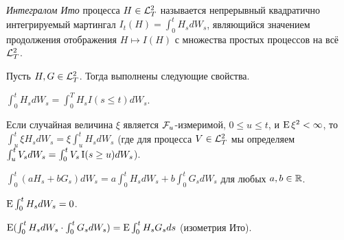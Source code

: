 \begin{definition}
\emph{Интегралом Ито} процесса $H\in \mathcal{L}^2_T$ называется непрерывный квадратично интегрируемый мартингал $I_t(H) = \int_0^t H_s d W_s$, являющийся значением продолжения отображения $H\mapsto I(H)$ с множества простых процессов на всё $\mathcal{L}^2_T$.
\end{definition}

\begin{proposition}
\label{3:p:integral-properties}
Пусть $H,G\in \mathcal{L}^2_T$. Тогда выполнены следующие свойства.
\begin{alphenum}
\item $\int_0^t H_s d W_s = \int_0^T H_s I(s\le t) d W_s$.

\item Если случайная величина $\xi$ является $\mathcal{F}_u$-измеримой, $0\le u \le t$, и $\operatorname{E}\xi^2 < \infty$, то $\int_u^t \xi H_s dW_s = \xi \int_u^t H_s d W_s$ (где для процесса $V\in \mathcal{L}^2_T$ мы определяем $\int_u^t V_s dW_s = \int_0^t V_s\operatorname{I}(s\ge u) dW_s$).

\item $\int_0^t(aH_s+bG_s) d W_s = a\int_0^t H_s d W_s + b\int_0^t G_s d W_s$ для любых $a,b\in\mathbb{R}$.

\item $\operatorname{E} \int_0^t H_s d W_s = 0$.

\item $\operatorname{E}(\int_0^t H_s d W_s \cdot \int_0^t G_s d W_s) = \operatorname{E} \int_0^t H_sG_s ds$ (изометрия Ито).
\end{alphenum}
\end{proposition}

